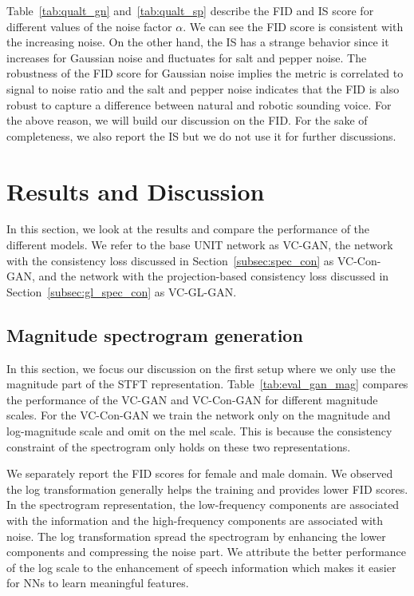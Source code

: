 Table~\ref{tab:qualt_gn} and~\ref{tab:qualt_sp} describe the FID and IS score for different values of the noise factor $\alpha$. We can see the FID score is consistent with the increasing noise. On the other hand, the IS has a strange behavior since it increases for Gaussian noise and fluctuates for salt and pepper noise. %
The robustness of the FID score for Gaussian noise implies the metric is correlated to signal to noise ratio and the salt and pepper noise indicates that the FID is also robust to capture a difference between natural and robotic sounding voice. For the above reason, we will build our discussion on the FID. For the sake of completeness, we also report the IS but we do not use it for further discussions.


\section{Results and Discussion}
\label{sec:discussion}
In this section, we look at the results and compare the performance of the different models. We refer to the base UNIT network as VC-GAN, the network with the consistency loss discussed in Section~\ref{subsec:spec_con} as VC-Con-GAN, and the network with the projection-based consistency loss discussed in Section~\ref{subsec:gl_spec_con} as VC-GL-GAN. 

\subsection{Magnitude spectrogram generation}
\label{subsec:magspecgen}
In this section, we focus our discussion on the first setup where we only use the magnitude part of the STFT representation.
Table~\ref{tab:eval_gan_mag} compares the performance of the VC-GAN and VC-Con-GAN for different magnitude scales. For the VC-Con-GAN we train the network only on the magnitude and log-magnitude scale and omit on the mel scale. This is because the consistency constraint of the spectrogram only holds on these two representations.

We separately report the FID scores for female and male domain. We observed the log transformation generally helps the training and provides lower FID scores. In the spectrogram representation, the low-frequency components are associated with the information and the high-frequency components are associated with noise. The log transformation spread the spectrogram by enhancing the lower components and compressing the noise part. We attribute the better performance of the log scale to the enhancement of speech information which makes it easier for NNs to learn meaningful features. 

